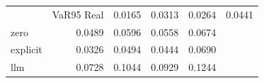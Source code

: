 \begin{tabular}{lrrrr}
\toprule
 & VaR95%
\midrule
Real & 0.0165 & 0.0313 & 0.0264 & 0.0441 \\
zero & 0.0489 & 0.0596 & 0.0558 & 0.0674 \\
explicit & 0.0326 & 0.0494 & 0.0444 & 0.0690 \\
llm & 0.0728 & 0.1044 & 0.0929 & 0.1244 \\
\bottomrule
\end{tabular}
